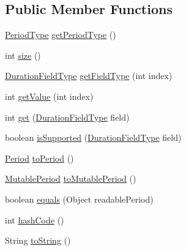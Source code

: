 \subsection*{Public Member Functions}
\begin{DoxyCompactItemize}
\item 
\hyperlink{classorg_1_1joda_1_1time_1_1_period_type}{Period\-Type} \hyperlink{interfaceorg_1_1joda_1_1time_1_1_readable_period_afb2459c7c2b73ac0e3ad8a20b9644233}{get\-Period\-Type} ()
\item 
int \hyperlink{interfaceorg_1_1joda_1_1time_1_1_readable_period_a873b4c6842bb068b91910bec4bd2bafe}{size} ()
\item 
\hyperlink{classorg_1_1joda_1_1time_1_1_duration_field_type}{Duration\-Field\-Type} \hyperlink{interfaceorg_1_1joda_1_1time_1_1_readable_period_a327cfd05bb6902381ec0677d98f84911}{get\-Field\-Type} (int index)
\item 
int \hyperlink{interfaceorg_1_1joda_1_1time_1_1_readable_period_abfe796efa57272802e85af24b0dc4a3b}{get\-Value} (int index)
\item 
int \hyperlink{interfaceorg_1_1joda_1_1time_1_1_readable_period_a9879a97f6a9c2790cfda79d96799afb7}{get} (\hyperlink{classorg_1_1joda_1_1time_1_1_duration_field_type}{Duration\-Field\-Type} field)
\item 
boolean \hyperlink{interfaceorg_1_1joda_1_1time_1_1_readable_period_a25165eb48424a5eadf0a404dab09db15}{is\-Supported} (\hyperlink{classorg_1_1joda_1_1time_1_1_duration_field_type}{Duration\-Field\-Type} field)
\item 
\hyperlink{classorg_1_1joda_1_1time_1_1_period}{Period} \hyperlink{interfaceorg_1_1joda_1_1time_1_1_readable_period_a529d53f15f57d58abed1a69877bcb71a}{to\-Period} ()
\item 
\hyperlink{classorg_1_1joda_1_1time_1_1_mutable_period}{Mutable\-Period} \hyperlink{interfaceorg_1_1joda_1_1time_1_1_readable_period_a1992a9694945a2cbba75d49d5134cbec}{to\-Mutable\-Period} ()
\item 
boolean \hyperlink{interfaceorg_1_1joda_1_1time_1_1_readable_period_a5098cc2af4aa9811d419118e7099c96f}{equals} (Object readable\-Period)
\item 
int \hyperlink{interfaceorg_1_1joda_1_1time_1_1_readable_period_a23027f5be82e78bc3478c6417856aca7}{hash\-Code} ()
\item 
String \hyperlink{interfaceorg_1_1joda_1_1time_1_1_readable_period_a6040c2282959a2d2f6694421591ad0f2}{to\-String} ()
\end{DoxyCompactItemize}


